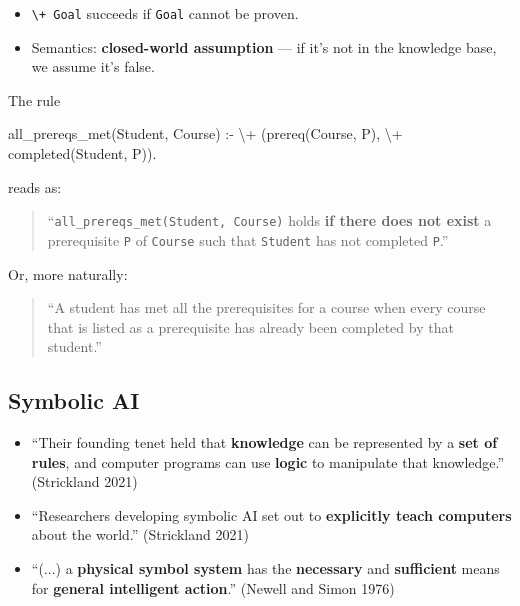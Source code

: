 \documentclass[
  letterpaper,
  DIV=11,
  numbers=noendperiod]{scrartcl}
\newenvironment{Shaded}{\begin{snugshade}}{\end{snugshade}}
\newcommand{\NormalTok}[1]{\textcolor[rgb]{0.00,0.23,0.31}{#1}}
\providecommand{\tightlist}{%
  \setlength{\itemsep}{0pt}\setlength{\parskip}{0pt}}
\begin{document}
\begin{itemize}
\tightlist
\item
  \texttt{\textbackslash{}+\ Goal} succeeds if \texttt{Goal} cannot be
  proven.
\item
  Semantics: \textbf{closed-world assumption} --- if it's not in the
  knowledge base, we assume it's false.
\end{itemize}

The rule

\begin{Shaded}
\begin{Highlighting}[]
\NormalTok{all\_prereqs\_met(Student, Course) :{-}}
\NormalTok{    \textbackslash{}+ (prereq(Course, P), \textbackslash{}+ completed(Student, P)).}
\end{Highlighting}
\end{Shaded}

reads as:

\begin{quote}
``\texttt{all\_prereqs\_met(Student,\ Course)} holds \textbf{if there
does not exist} a prerequisite \texttt{P} of \texttt{Course} such that
\texttt{Student} has not completed \texttt{P}.''
\end{quote}

Or, more naturally:

\begin{quote}
``A student has met all the prerequisites for a course when every course
that is listed as a prerequisite has already been completed by that
student.''
\end{quote}

\subsection{Symbolic AI}\label{symbolic-ai}

\begin{itemize}
\tightlist
\item
  ``Their founding tenet held that \textbf{knowledge} can be represented
  by a \textbf{set of rules}, and computer programs can use
  \textbf{logic} to manipulate that knowledge.'' (Strickland 2021)
\item
  ``Researchers developing symbolic AI set out to \textbf{explicitly
  teach computers} about the world.'' (Strickland 2021)
\item
  ``(\(\ldots\)) a \textbf{physical symbol system} has the
  \textbf{necessary} and \textbf{sufficient} means for \textbf{general
  intelligent action}.'' (Newell and Simon 1976)
\end{itemize}
\end{document}
